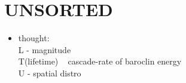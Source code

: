 \chapter{UNSORTED}

\begin{itemize}

\item
thought:\\ L - magnitude\\ T(lifetime) ~ cascade-rate of baroclin energy \cite{larichev1995eddy} \\ U - spatial distro



\end{itemize}
